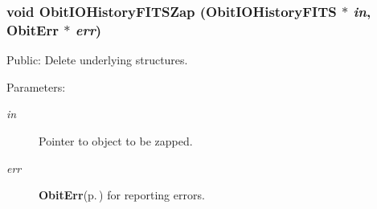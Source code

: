 \subsubsection{\setlength{\rightskip}{0pt plus 5cm}void Obit\-IOHistory\-FITSZap ({\bf Obit\-IOHistory\-FITS} $\ast$ {\em in}, {\bf Obit\-Err} $\ast$ {\em err})}\label{ObitIOHistoryFITS_8h_a9}


Public: Delete underlying structures. 

\begin{Desc}
\item[Parameters:]
\begin{description}
\item[{\em in}]Pointer to object to be zapped. \item[{\em err}]{\bf Obit\-Err}{\rm (p.\,\pageref{structObitErr})} for reporting errors. \end{description}
\end{Desc}
